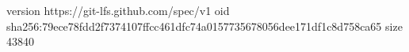 version https://git-lfs.github.com/spec/v1
oid sha256:79ece78fdd2f7374107ffcc461dfc74a0157735678056dee171df1c8d758ca65
size 43840
